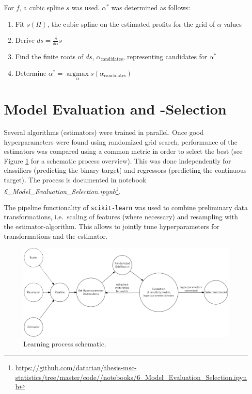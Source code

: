 \documentclass[
  11pt,
  a4paper,
  DIV=12,captions=tableheading,oneside,titlepage]{scrbook}
\providecommand{\tightlist}{%
  \setlength{\itemsep}{0pt}\setlength{\parskip}{0pt}}
\begin{document}
For \(f\), a cubic spline \(s\) was used. \(\alpha^*\) was determined as follows:

\begin{enumerate}
\def\labelenumi{\arabic{enumi}.}
\tightlist
\item
  Fit \(s(\Pi)\), the cubic spline on the estimated profits for the grid of \(\alpha\) values
\item
  Derive \(ds = \frac{\delta}{\delta \alpha} s\)
\item
  Find the finite roots of \(ds\), \(\alpha_{\text{candidates}}\), representing candidates for \(\alpha^*\)
\item
  Determine \(\alpha^* = \underset{\alpha}{\operatorname{argmax}} s(\alpha_{\text{candidates}})\)
\end{enumerate}

\hypertarget{eval-and-select}{%
\section{Model Evaluation and -Selection}\label{eval-and-select}}

Several algorithms (estimators) were trained in parallel. Once good hyperparameters were found using randomized grid search, performance of the estimators was compared using a common metric in order to select the best (see Figure \ref{fig:evaluation-selection} for a schematic process overview). This was done independently for classifiers (predicting the binary target) and regressors (predicting the continuous target). The process is documented in notebook \emph{6\_Model\_Evaluation\_Selection.ipynb}\footnote{\url{https://github.com/datarian/thesis-msc-statistics/tree/master/code//notebooks/6_Model_Evaluation_Selection.ipynb}}.

The pipeline functionality of \texttt{scikit-learn} was used to combine preliminary data transformations, i.e.~scaling of features (where necessary) and resampling with the estimator-algorithm. This allows to jointly tune hyperparameters for transformations and the estimator.

\begin{figure}

{\centering \includegraphics[width=0.8\linewidth]{figures/methods/evaluation-process} 

}

\caption{Learning process schematic.}\label{fig:evaluation-selection}
\end{figure}
\end{document}
